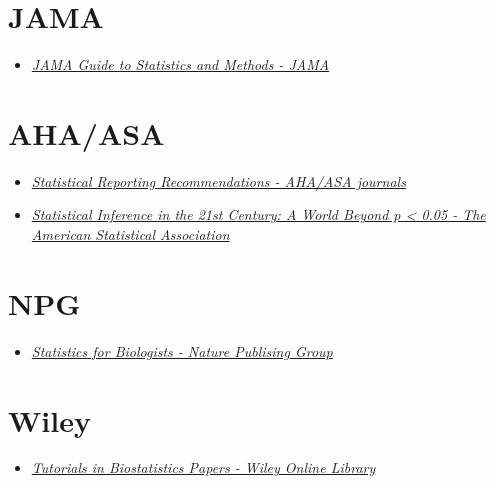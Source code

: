 \documentclass[
]{book}
\providecommand{\tightlist}{%
  \setlength{\itemsep}{0pt}\setlength{\parskip}{0pt}}
\begin{document}
\hypertarget{jama}{%
\section{JAMA}\label{jama}}

\begin{itemize}
\tightlist
\item
  \href{https://jamanetwork.com/collections/44042/jama-guide-to-statistics-and-methods}{\emph{JAMA Guide to Statistics and Methods - JAMA}}
\end{itemize}

\hypertarget{aha-asa}{%
\section{AHA/ASA}\label{aha-asa}}

\begin{itemize}
\item
  \href{https://www.ahajournals.org/statistical-recommendations}{\emph{Statistical Reporting Recommendations - AHA/ASA journals}}
\item
  \href{https://www.tandfonline.com/toc/utas20/73/sup1?nav=tocList}{\emph{Statistical Inference in the 21st Century: A World Beyond p \textless{} 0.05 - The American Statistical Association}}
\end{itemize}

\hypertarget{npg}{%
\section{NPG}\label{npg}}

\begin{itemize}
\tightlist
\item
  \href{https://www.nature.com/collections/qghhqm}{\emph{Statistics for Biologists - Nature Publising Group}}
\end{itemize}

\hypertarget{wiley}{%
\section{Wiley}\label{wiley}}

\begin{itemize}
\tightlist
\item
  \href{https://onlinelibrary.wiley.com/page/journal/10970258/homepage/tutorials.htm}{\emph{Tutorials in Biostatistics Papers - Wiley Online Library}}
\end{itemize}
\end{document}
